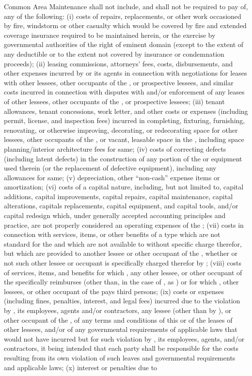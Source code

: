 Common Area Maintenance shall not include, and \lessee shall not be required to pay \lesseesPercentage of, any of the following: (i) costs of repairs, replacements, or other work occasioned by fire, windstorm or other casualty which would be covered by fire and extended coverage insurance required to be maintained herein, or the exercise by governmental authorities of the right of eminent domain (except to the extent of any deductible or to the extent not covered by insurance or condemnation proceeds); (ii) leasing commissions, attorneys' fees, costs, disbursements, and other expenses incurred by \lessor or its agents in connection with negotiations for leases with other lessees, other occupants of the \building, or prospective lessees, and similar costs incurred in connection with disputes with and/or enforcement of any leases of other lessees, other occupants of the \building, or prospective lessees; (iii) tenant allowances, tenant concessions, work letter, and other costs or expenses (including permit, license, and inspection fees) incurred in completing, fixturing, furnishing, renovating, or otherwise improving, decorating, or redecorating space for other lessees, other occupants of the \building, or vacant, leasable space in the \building, including space planning/interior architecture fees for same; (iv) costs of correcting defects (including latent defects) in the construction of any portion of the \building or equipment used therein (or the replacement of defective equipment), including any allowances for same; (v) depreciation, other ``non-cash'' expense items or amortization; (vi) costs of a capital nature, including, but not limited to, capital additions, capital improvements, capital repairs, capital maintenance, capital alterations, capitals replacements, capital equipment, and capital tools, and/or capital redesign which, under generally accepted accounting principles and practice, are not properly considered an operating expenses of the \building; (vii) costs in connection with services, items, or other benefits of a type which are not standard for the \building and which are not available to \lessee without specific charge therefor, but which are provided to another lessee or other occupant of the \building, whether or not such other lessee or occupant is specifically charged therefor by \lessor; (viii) costs of services, items, and benefits for which \lessee, any other lessee, or other occupant of the \building specifically reimburses \lessor (other than, in the case of \lessee, as \additionalRent) or for which \lessee, other lessees, or  other occupant of the \building pays third persons; (ix) costs or expenses (including fines, penalties, interest, and legal fees) incurred due to the violation by \lessor, its employees, agents and/or contractors, any lessee (other than by \lessee), or other occupant of the \building, of any terms and conditions of this \lease or of the leases of other lessees, and/or of any governmental requirements of applicable laws that would not have incurred but for such violation by \lessor, its employees, agents, and/or contractors, it being intended that each party shall be responsible for the costs resulting from its own violation of such leaves and governmental requirements and applicable laws; (x) interest or penalties due to 